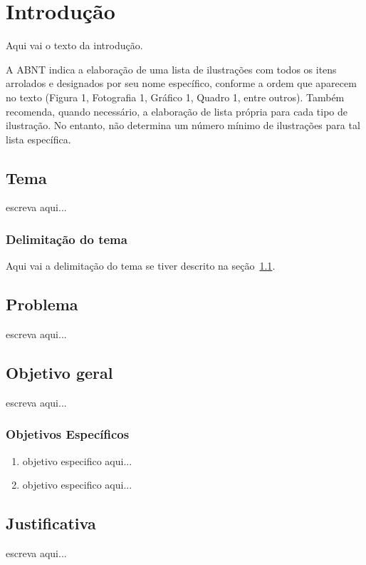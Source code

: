 \chapter{Introdução}\label{ch:intro}
Aqui vai o texto da introdução.

A ABNT indica a elaboração de uma lista de ilustrações com todos os itens arrolados e designados por seu nome específico, conforme a ordem que aparecem no texto (Figura 1, Fotografia 1, Gráfico 1, Quadro 1, entre outros). Também recomenda, quando necessário, a elaboração de lista própria para cada tipo de ilustração. No entanto, não determina um número mínimo de ilustrações para tal lista específica.

\section{Tema}\label{sec:tema}

escreva aqui...

\subsection{Delimitação do tema}\label{sec:deltema}
Aqui vai a delimitação do tema se tiver descrito na seção~\ref{sec:tema}.




\section{Problema}\label{sec:probPesquisa}
escreva aqui...

\section{Objetivo geral}\label{sec:objGeral}
escreva aqui...

\subsection{Objetivos Específicos}\label{sec:objEsp}
\begin{enumerate}
	\item objetivo especifico aqui...
	\item objetivo especifico aqui...
\end{enumerate}

\section{Justificativa}\label{sec:just}
escreva aqui...

